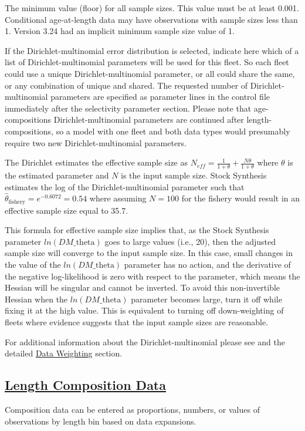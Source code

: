 The minimum value (floor) for all sample sizes. This value must be at least 0.001. Conditional age-at-length data may have observations with sample sizes less than 1. Version 3.24 had an implicit minimum sample size value of 1.

If the Dirichlet-multinomial error distribution is selected, indicate here which of a list of Dirichlet-multinomial parameters will be used for this fleet. So each fleet could use a unique Dirichlet-multinomial parameter, or all could share the same, or any combination of unique and shared. The requested number of Dirichlet-multinomial parameters are specified as parameter lines in the control file immediately after the selectivity parameter section. Please note that age-compositions Dirichlet-multinomial parameters are continued after length-compositions, so a model with one fleet and both data types would presumably require two new Dirichlet-multinomial parameters.  	 	
	
The Dirichlet estimates the effective sample size as $N_{eff}=\frac{1}{1+\theta}+\frac{N\theta}{1+\theta}$ where $\theta$ is the estimated parameter and $N$ is the input sample size. Stock Synthesis estimates the log of the Dirichlet-multinomial parameter such that $\hat{\theta}_{\text{fishery}} = e^{-0.6072} = 0.54$ where assuming $N=100$ for the fishery would result in an effective sample size equal to 35.7.
	
This formula for effective sample size implies that, as the Stock Synthesis parameter $ln(DM\text{\_theta})$ goes to large values (i.e., 20), then the adjusted sample size will converge to the input sample size. In this case, small changes in the value of the $ln(DM\text{\_theta})$ parameter has no action, and the derivative of the negative log-likelihood is zero with respect to the parameter, which means the Hessian will be singular and cannot be inverted. To avoid this non-invertible Hessian when the $ln(DM\text{\_theta})$ parameter becomes large, turn it off while fixing it at the high value. This is equivalent to turning off down-weighting of fleets where evidence suggests that the input sample sizes are reasonable.
	
For additional information about the Dirichlet-multinomial please see \citet{thorson-model-based-2017} and the detailed \hyperlink{DataWeight}{Data Weighting} section.

\hypertarget{CompTiming}{}
\subsection[Length Composition Data]{\protect\hyperlink{CompTiming}{Length Composition Data}}
Composition data can be entered as proportions, numbers, or values of observations by length bin based on data expansions.  

